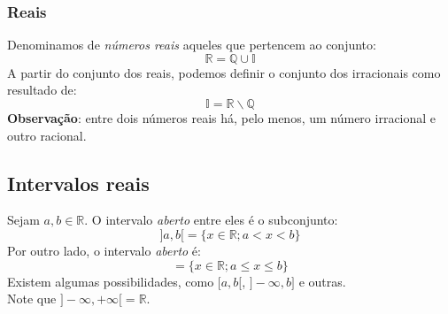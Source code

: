 \documentclass{article}
\begin{document}
\subsubsection{Reais}
Denominamos de \emph{números reais} aqueles que pertencem ao conjunto:
\begin{displaymath}
    \mathbb{R} = \mathbb{Q} \cup \mathbb{I}
\end{displaymath}
A partir do conjunto dos reais, podemos definir o conjunto dos irracionais como resultado de:
\begin{displaymath}
    \mathbb{I} = \mathbb{R} \backslash \mathbb{Q}
\end{displaymath}
\textbf{Observação}: entre dois números reais há, pelo menos, um número irracional e outro racional.

\subsection{Intervalos reais}
Sejam $a, b \in \mathbb{R}$. O intervalo \emph{aberto} entre eles é o subconjunto:
\begin{displaymath}
    ]a, b[ = \{ x \in \mathbb{R}; a < x < b\}
\end{displaymath}
Por outro lado, o intervalo \emph{aberto} é:
\begin{displaymath}
    [a, b] = \{ x \in \mathbb{R}; a \leq x \leq b\}
\end{displaymath}
Existem algumas possibilidades, como $[a, b[$, $] - \infty, b] $ e outras. \\ Note que $ ]-\infty, +\infty [ = \mathbb{R}$.
\end{document}

